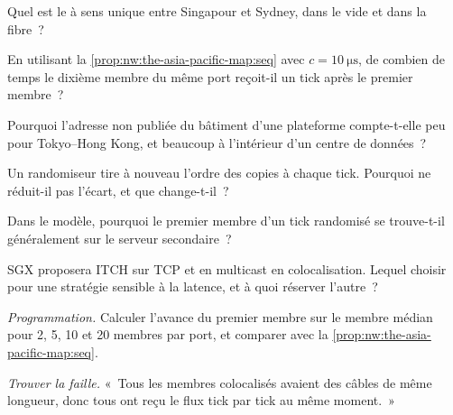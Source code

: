 \begin{exercise}[$\star$]\label{exo:nw:the-asia-pacific-map:1}
Quel est le  à sens unique entre Singapour et Sydney, dans le vide et dans la fibre~?
\end{exercise}

\begin{exercise}[$\star$]\label{exo:nw:the-asia-pacific-map:2}
En utilisant la \cref{prop:nw:the-asia-pacific-map:seq} avec $c = \qty{10}{\micro\second}$, de combien de temps le dixième membre
du même port reçoit-il un tick après le premier membre~?
\end{exercise}

\begin{exercise}[$\star$]\label{exo:nw:the-asia-pacific-map:3}
Pourquoi l'adresse non publiée du bâtiment d'une plateforme compte-t-elle peu pour Tokyo--Hong Kong, et beaucoup à l'intérieur d'un centre de données~?
\end{exercise}

\begin{exercise}[$\star\star$]\label{exo:nw:the-asia-pacific-map:4}
Un randomiseur tire à nouveau l'ordre des copies à chaque tick. Pourquoi ne réduit-il pas l'écart, et que change-t-il~?
\end{exercise}

\begin{exercise}[$\star\star$]\label{exo:nw:the-asia-pacific-map:5}
Dans le modèle, pourquoi le premier membre d'un tick randomisé se trouve-t-il généralement sur le serveur secondaire~?
\end{exercise}

\begin{exercise}[$\star\star$]\label{exo:nw:the-asia-pacific-map:6}
SGX proposera ITCH sur TCP et en multicast en colocalisation. Lequel choisir pour une stratégie sensible à la latence, et à quoi réserver
l'autre~?
\end{exercise}

\begin{exercise}[$\star\star\star$]\label{exo:nw:the-asia-pacific-map:7}
\emph{Programmation.} Calculer l'avance du premier membre sur le membre médian pour 2, 5, 10 et 20 membres par port, et comparer avec la
\cref{prop:nw:the-asia-pacific-map:seq}.
\end{exercise}

\begin{exercise}[$\star\star\star$]\label{exo:nw:the-asia-pacific-map:8}
\emph{Trouver la faille.} «~Tous les membres colocalisés avaient des câbles de même longueur, donc tous ont reçu le flux tick par tick au même moment.~»
\end{exercise}

